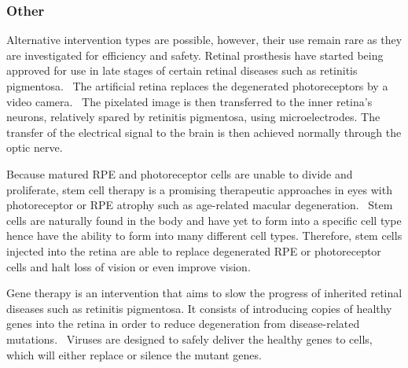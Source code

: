 \documentclass[12pt,a4paper]{journal}
\begin{document}
\subsubsection*{Other}

Alternative intervention types are possible, however, their use remain rare as they are investigated for efficiency and safety.
Retinal prosthesis have started being approved for use in late stages of certain retinal diseases such as retinitis pigmentosa.~\cite{Luo_2016}
The artificial retina replaces the degenerated photoreceptors by a video camera.~\cite{Luo_2016,Stingl_2017}
The pixelated image is then transferred to the inner retina's neurons, relatively spared by retinitis pigmentosa, using microelectrodes.
The transfer of the electrical signal to the brain is then achieved normally through the optic nerve.~\cite{Luo_2016,Stingl_2017}

Because matured RPE and photoreceptor cells are unable to divide and proliferate, stem cell therapy is a promising therapeutic approaches in eyes with photoreceptor or RPE atrophy such as age-related macular degeneration.~\cite{Berta_2011,Stern_2015}
Stem cells are naturally found in the body and have yet to form into a specific cell type hence have the ability to form into many different cell types.
Therefore, stem cells injected into the retina are able to replace degenerated RPE or photoreceptor cells and halt loss of vision or even improve vision.~\cite{ONeill_2020}

Gene therapy is an intervention that aims to slow the progress of inherited retinal diseases such as retinitis pigmentosa.
It consists of introducing copies of healthy genes into the retina in order to reduce degeneration from disease-related mutations.~\cite{Battu_2022}
Viruses are designed to safely deliver the healthy genes to cells, which will either replace or silence the mutant genes.~\cite{Battu_2022} 


%

\end{document}
